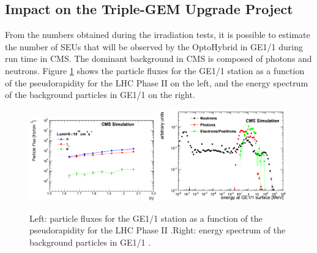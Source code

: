     \subsection{Impact on the Triple-GEM Upgrade Project}

      From the numbers obtained during the irradiation tests, it is possible to estimate the number of SEUs that will be observed by the OptoHybrid in GE1/1 during run time in CMS. The dominant background in CMS is composed of photons and neutrons. Figure \ref{fig:II-5-neutrons} shows the particle fluxes for the GE1/1 station as a function of the pseudorapidity for the LHC Phase II on the left, and the energy spectrum of the background particles in GE1/1 on the right. \\

      \begin{figure}[h!]
        \centering
        \includegraphics[width=0.49\textwidth]{img/II-5-irradiation/fluka.png}
        \includegraphics[width=0.49\textwidth]{img/II-5-irradiation/flux.png}
        \caption{Left: particle fluxes for the GE1/1 station as a function of the pseudorapidity for the LHC Phase II \cite{Zenoni:2065693}.Right: energy spectrum of the background particles in GE1/1 \cite{Zenoni:2065693}.}
        \label{fig:II-5-neutrons}
      \end{figure}

